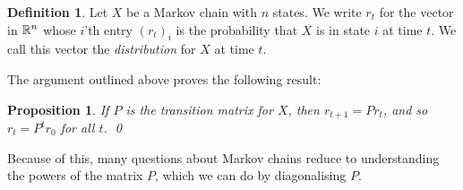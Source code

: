 \documentclass[reqno]{amsart}
\newtheorem{proposition}[theorem]{Proposition}
\theoremstyle{definition}
\newtheorem{definition}[theorem]{Definition}
\newcommand{\dfn}[1]{\emph{{#1}}\index{#1}}
\begin{document}
\begin{definition}\label{defn-distribution}
 Let $X$ be a Markov chain with $n$ states.  We write $r_t$ for the
 vector in ${\mathbb{R}}^n$ whose $i$'th entry $(r_t)_i$ is the probability that
 $X$ is in state $i$ at time $t$.  We call this vector the
 \dfn{distribution} for $X$ at time $t$.
\end{definition}

The argument outlined above proves the following result:

\begin{proposition}\label{prop-markov-power}
 If $P$ is the transition matrix for $X$, then $r_{t+1}=Pr_t$, and so
 $r_t=P^tr_0$ for all $t$. \qed
\end{proposition}

Because of this, many questions about Markov chains reduce to
understanding the powers of the matrix $P$, which we can do by
diagonalising $P$.
\end{document}
